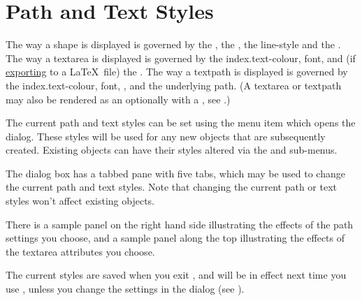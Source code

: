 

\chapter{Path and Text Styles}\label{sec:styles}

The way a \gls{shape} is displayed is governed by the 
, the , the 
\gls{line-style} and the . 
The way a \gls{textarea} is displayed is governed by the
\gls{index.text-colour}, \gls{font},  
and (if \hyperref[sec:exportimage]{exporting} to a \LaTeX\ file) the
. The way a \gls{textpath} is displayed is governed
by the \gls{index.text-colour}, \gls{font}, ,
 and the underlying path. (A
\gls*{textarea} or \gls*{textpath} may also be rendered as an
 optionally with a , see
.)


The current path and text styles can be set using the
 menu item which opens the 
dialog. These styles will be used for any new \glspl{object} that
are subsequently created. Existing \glspl{object} can have their
styles altered via the  and 
sub-menus. 


The  dialog box has a tabbed pane with five tabs,
which may be used to change the current path and text styles.
Note that changing the current path or text styles won't affect
existing \glspl{object}. 

There is a sample panel on the right hand side illustrating the
effects of the \gls{path} settings you choose, and a sample panel along
the top illustrating the effects of the \gls*{textarea} attributes
you choose.

The current styles are saved when you exit \FlowframTk, and will be in
effect next time you use \FlowframTk, unless you change the 
 settings in the  dialog
(see ).

